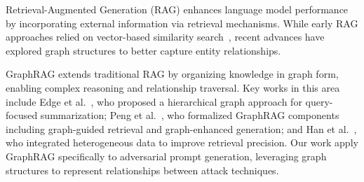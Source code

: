 Retrieval-Augmented Generation (RAG) enhances language model performance by incorporating external information via retrieval mechanisms. While early RAG approaches relied on vector-based similarity search~\cite{lewis2020retrieval}, recent advances have explored graph structures to better capture entity relationships.

GraphRAG extends traditional RAG by organizing knowledge in graph form, enabling complex reasoning and relationship traversal. Key works in this area include Edge et al.~\cite{edge2024local}, who proposed a hierarchical graph approach for query-focused summarization; Peng et al.~\cite{peng2024graph}, who formalized GraphRAG components including graph-guided retrieval and graph-enhanced generation; and Han et al.~\cite{han2024retrieval}, who integrated heterogeneous data to improve retrieval precision. Our work apply GraphRAG specifically to adversarial prompt generation, leveraging graph structures to represent relationships between attack techniques.
